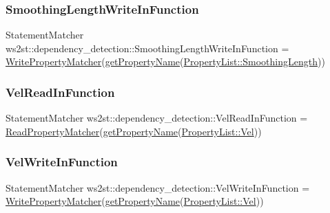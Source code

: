 \subsubsection{\texorpdfstring{Smoothing\+Length\+Write\+In\+Function}{SmoothingLengthWriteInFunction}}
{\footnotesize\ttfamily Statement\+Matcher ws2st\+::dependency\+\_\+detection\+::\+Smoothing\+Length\+Write\+In\+Function = \mbox{\hyperlink{namespacews2st_1_1dependency__detection_a0d8350273a214bbd4586dedadf37ab83}{Write\+Property\+Matcher}}(\mbox{\hyperlink{namespacews2st_1_1dependency__detection_aa7715a6e777bd59ab78718644a58b1fa}{get\+Property\+Name}}(\mbox{\hyperlink{namespacews2st_1_1dependency__detection_abcddd986f080a9e5c494edfad3c3faf7a209c4a2539e3220aadbf61e605f9bfdc}{Property\+List\+::\+Smoothing\+Length}}))}

\mbox{\label{namespacews2st_1_1dependency__detection_afd7c33aadfb9dad623a578243d3b1e4d}} 
\subsubsection{\texorpdfstring{Vel\+Read\+In\+Function}{VelReadInFunction}}
{\footnotesize\ttfamily Statement\+Matcher ws2st\+::dependency\+\_\+detection\+::\+Vel\+Read\+In\+Function = \mbox{\hyperlink{namespacews2st_1_1dependency__detection_aa8821ec3e79b7058ff4ac29b7b5a8374}{Read\+Property\+Matcher}}(\mbox{\hyperlink{namespacews2st_1_1dependency__detection_aa7715a6e777bd59ab78718644a58b1fa}{get\+Property\+Name}}(\mbox{\hyperlink{namespacews2st_1_1dependency__detection_abcddd986f080a9e5c494edfad3c3faf7aec930ca2dec8aa0b05a106add08d538e}{Property\+List\+::\+Vel}}))}

\mbox{\label{namespacews2st_1_1dependency__detection_a13ceaf43f331b3380b0cfa95693df70c}} 
\subsubsection{\texorpdfstring{Vel\+Write\+In\+Function}{VelWriteInFunction}}
{\footnotesize\ttfamily Statement\+Matcher ws2st\+::dependency\+\_\+detection\+::\+Vel\+Write\+In\+Function = \mbox{\hyperlink{namespacews2st_1_1dependency__detection_a0d8350273a214bbd4586dedadf37ab83}{Write\+Property\+Matcher}}(\mbox{\hyperlink{namespacews2st_1_1dependency__detection_aa7715a6e777bd59ab78718644a58b1fa}{get\+Property\+Name}}(\mbox{\hyperlink{namespacews2st_1_1dependency__detection_abcddd986f080a9e5c494edfad3c3faf7aec930ca2dec8aa0b05a106add08d538e}{Property\+List\+::\+Vel}}))}

